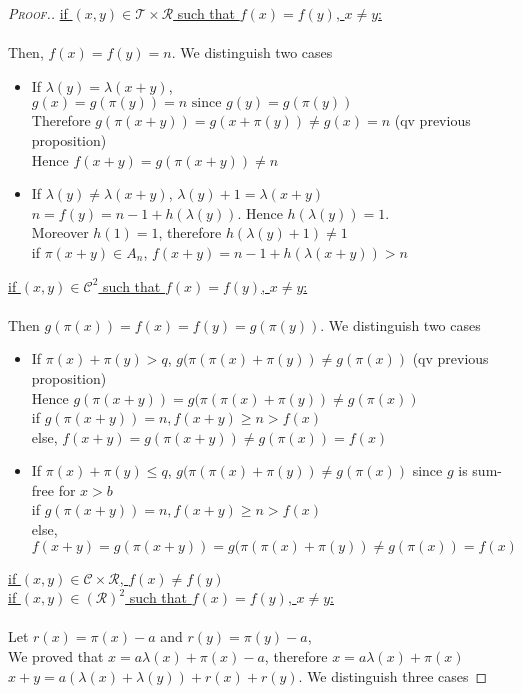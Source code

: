 \begin{proof}[\textsc{Proof.}]
\underline{if \((x,y) \in \mathcal{T} \times \mathcal{R}\) such that \(f(x)=f(y)\), \(x \neq y\):}\\
\\Then, \(f(x)=f(y)=n\). We distinguish two cases

\begin{itemize}
\item If \(\lambda(y)=\lambda(x+y)\),
\\\(g(x)=g(\pi(y))=n \text{ since } g(y)=g(\pi(y))\)
\\Therefore \(g(\pi(x+y))=g(x+\pi(y)) \neq g(x)=n\) (qv previous proposition)
\\Hence \(f(x+y)=g(\pi(x+y))\neq n\)
\item If  \(\lambda(y)\neq \lambda(x+y)\), \(\lambda(y)+1= \lambda(x+y)\)\\
\(n=f(y)=n-1+h(\lambda(y))\). Hence \(h(\lambda(y))=1\).
\\Moreover \(h(1)=1\), therefore \(h(\lambda(y)+1) \neq 1\)
\\if \(\pi(x+y) \in A_n\), \(f(x+y)=n-1+h(\lambda(x+y))>n\)
\end{itemize}

\underline{if \((x,y) \in \mathcal{C}^2\) such that \(f(x)=f(y)\), \(x \neq y\):}\\
\\Then  \(g(\pi(x))=f(x)=f(y)=g(\pi(y))\). We distinguish two cases

\begin{itemize}
\item If \(\pi(x)+\pi(y)>q\), \(g(\pi(\pi(x)+\pi(y)) \neq g(\pi(x))\) (qv previous proposition)
\\Hence \(g(\pi(x+y))= g(\pi(\pi(x)+\pi(y))\neq g(\pi(x))\)
\\if \(g(\pi(x+y))=n, f(x+y)\geqslant n > f(x)\)
\\else, \(f(x+y)=g(\pi(x+y))\neq g(\pi(x))=f(x)\)
\item If  \(\pi(x)+\pi(y)\leqslant q\), \(g(\pi(\pi(x)+\pi(y)) \neq g(\pi(x))\) since \(g\) is sum-free for \(x>b\)
\\if \(g(\pi(x+y))=n, f(x+y)\geqslant n > f(x)\)
\\else, \(f(x+y)=g(\pi(x+y))=g(\pi(\pi(x)+\pi(y))\neq g(\pi(x))=f(x)\)
\end{itemize}

\underline{if \((x,y) \in \mathcal{C} \times \mathcal{R} \), \(f(x)\neq f(y)\)}\\

\underline{if \((x,y) \in (\mathcal{R})^2\) such that \(f(x)=f(y)\), \(x \neq y\):}\\
\\Let \(r(x)=\pi(x)-a\) and \(r(y)=\pi(y)-a\),
\\We proved that \(x=a\lambda(x)+\pi(x)-a\), therefore \(x=a\lambda(x)+\pi(x)\)
\\\(x+y=a(\lambda(x)+\lambda(y))+r(x)+r(y)\). We distinguish three cases


\end{proof}
